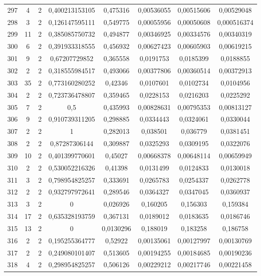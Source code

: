 \begin{longtable}{|c|c|c|c|c|c|c|c|}
297 & 4 & 2 & 0,400213153105 & 0,475316 & 0,00536055 & 0,00515606 & 0,00529048  \\
298 & 3 & 2 & 0,126147595111 & 0,549775 & 0,00055956 & 0,00050608 & 0,000516374  \\
299 & 11 & 2 & 0,385085750732 & 0,494877 & 0,00346925 & 0,00334576 & 0,00340319  \\
300 & 6 & 2 & 0,391933318555 & 0,456932 & 0,00627423 & 0,00605903 & 0,00619215  \\
301 & 9 & 2 & 0,67207729852 & 0,365558 & 0,0191753 & 0,0185399 & 0,0188855  \\
302 & 2 & 2 & 0,318555984517 & 0,493066 & 0,00377806 & 0,00360514 & 0,00372913  \\
303 & 35 & 2 & 0,773160280252 & 0,42346 & 0,0107601 & 0,0102734 & 0,0104956  \\
304 & 2 & 2 & 0,723736478807 & 0,359465 & 0,0228153 & 0,0216203 & 0,0225292  \\
305 & 7 & 2 & 0,5 & 0,435993 & 0,00828631 & 0,00795353 & 0,00813127  \\
306 & 9 & 2 & 0,910739311205 & 0,298885 & 0,0334443 & 0,0324061 & 0,0330044  \\
307 & 2 & 2 & 1 & 0,282013 & 0,038501 & 0,036779 & 0,0381451  \\
308 & 2 & 2 & 0,87287306144 & 0,309887 & 0,0325293 & 0,0309195 & 0,0322076  \\
309 & 10 & 2 & 0,401399770601 & 0,45027 & 0,00668378 & 0,00648114 & 0,00659949  \\
310 & 2 & 2 & 0,530052216326 & 0,41398 & 0,0131499 & 0,0124833 & 0,0130018  \\
311 & 3 & 2 & 0,798954825257 & 0,333691 & 0,0265783 & 0,0254337 & 0,0262778  \\
312 & 2 & 2 & 0,932797972641 & 0,289546 & 0,0364327 & 0,0347045 & 0,0360937  \\
313 & 3 & 2 & 0 & 0,026926 & 0,160205 & 0,156303 & 0,159384  \\
314 & 17 & 2 & 0,635328193759 & 0,367131 & 0,0189012 & 0,0183635 & 0,0186746  \\
315 & 13 & 2 & 0 & 0,0130296 & 0,188019 & 0,183258 & 0,186758  \\
316 & 2 & 2 & 0,195255364777 & 0,52922 & 0,00135061 & 0,00127997 & 0,00130769  \\
317 & 2 & 2 & 0,249080101407 & 0,513605 & 0,00194255 & 0,00184685 & 0,00190236  \\
318 & 4 & 2 & 0,298954825257 & 0,506126 & 0,00229212 & 0,00217746 & 0,00221458  \\

\end{longtable}
